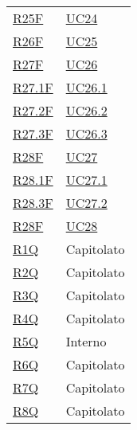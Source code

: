 \begin{center}
\begin{longtable}[!h]{p{50px} p{50px}}
        \hyperref[tab:RequisitiFunzionali]{R25F}     & \hyperref[sec:UC24]{UC24}     \\
        \hyperref[tab:RequisitiFunzionali]{R26F}     & \hyperref[sec:UC25]{UC25}     \\
        \hyperref[tab:RequisitiFunzionali]{R27F}     & \hyperref[sec:UC26]{UC26}     \\
        \hyperref[tab:RequisitiFunzionali]{R27.1F}   & \hyperref[sec:UC26.1]{UC26.1} \\
        \hyperref[tab:RequisitiFunzionali]{R27.2F}   & \hyperref[sec:UC26.2]{UC26.2} \\
        \hyperref[tab:RequisitiFunzionali]{R27.3F}   & \hyperref[sec:UC26.3]{UC26.3} \\
        \hyperref[tab:RequisitiFunzionali]{R28F}     & \hyperref[sec:UC27]{UC27}     \\
        \hyperref[tab:RequisitiFunzionali]{R28.1F}   & \hyperref[sec:UC27.1]{UC27.1} \\
        \hyperref[tab:RequisitiFunzionali]{R28.3F}   & \hyperref[sec:UC27.2]{UC27.2} \\
        \hyperref[tab:RequisitiFunzionali]{R28F}     & \hyperref[sec:UC28]{UC28}     \\

        \hyperref[tab:RequisitiQualita]{R1Q}         & Capitolato                    \\
        \hyperref[tab:RequisitiQualita]{R2Q}         & Capitolato                    \\
        \hyperref[tab:RequisitiQualita]{R3Q}         & Capitolato                    \\
        \hyperref[tab:RequisitiQualita]{R4Q}         & Capitolato                    \\
        \hyperref[tab:RequisitiQualita]{R5Q}         & Interno                       \\
        \hyperref[tab:RequisitiQualita]{R6Q}         & Capitolato                    \\
        \hyperref[tab:RequisitiQualita]{R7Q}         & Capitolato                    \\
        \hyperref[tab:RequisitiQualita]{R8Q}         & Capitolato                    \\


\end{longtable}
\end{center}
